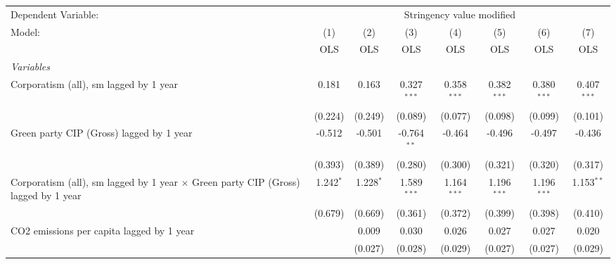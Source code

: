 
\begingroup
\centering
\begin{tabular}{lccccccc}
   \toprule
   Dependent Variable: & \multicolumn{7}{c}{Stringency value modified}\\
   Model:                                                                                    & (1)         & (2)         & (3)           & (4)           & (5)           & (6)           & (7)\\  
                                                                                             &  OLS        & OLS         & OLS           & OLS           & OLS           & OLS           & OLS\\  
   \midrule
   \emph{Variables}\\
   Corporatism (all), sm lagged by 1 year                                                    & 0.181       & 0.163       & 0.327$^{***}$ & 0.358$^{***}$ & 0.382$^{***}$ & 0.380$^{***}$ & 0.407$^{***}$\\   
                                                                                             & (0.224)     & (0.249)     & (0.089)       & (0.077)       & (0.098)       & (0.099)       & (0.101)\\   
   Green party CIP (Gross) lagged by 1 year                                                  & -0.512      & -0.501      & -0.764$^{**}$ & -0.464        & -0.496        & -0.497        & -0.436\\   
                                                                                             & (0.393)     & (0.389)     & (0.280)       & (0.300)       & (0.321)       & (0.320)       & (0.317)\\   
   Corporatism (all), sm lagged by 1 year $\times$ Green party CIP (Gross) lagged by 1 year  & 1.242$^{*}$ & 1.228$^{*}$ & 1.589$^{***}$ & 1.164$^{***}$ & 1.196$^{***}$ & 1.196$^{***}$ & 1.153$^{**}$\\   
                                                                                             & (0.679)     & (0.669)     & (0.361)       & (0.372)       & (0.399)       & (0.398)       & (0.410)\\   
   CO2 emissions per capita lagged by 1 year                                                 &             & 0.009       & 0.030         & 0.026         & 0.027         & 0.027         & 0.020\\   
                                                                                             &             & (0.027)     & (0.028)       & (0.029)       & (0.027)       & (0.027)       & (0.029)\\   

\end{tabular}
